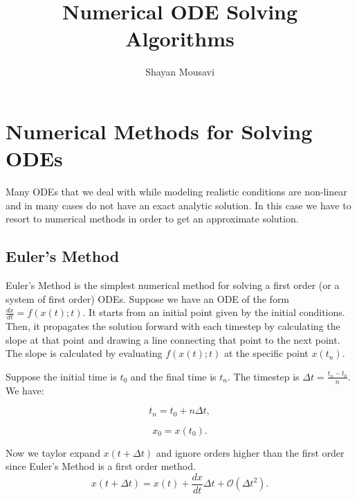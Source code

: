 \documentclass[11pt]{article}
\title{Numerical ODE Solving Algorithms}
\author{Shayan Mousavi}
\begin{document}
    
    \maketitle
    
    

    
    \hypertarget{numerical-methods-for-solving-odes}{%
\section{Numerical Methods for Solving
ODEs}\label{numerical-methods-for-solving-odes}}

Many ODEs that we deal with while modeling realistic conditions are
non-linear and in many cases do not have an exact analytic solution. In
this case we have to resort to numerical methods in order to get an
approximate solution.

\hypertarget{eulers-method}{%
\subsection{Euler's Method}\label{eulers-method}}

Euler's Method is the simplest numerical method for solving a first
order (or a system of first order) ODEs. Suppose we have an ODE of the
form \(\frac{dx}{dt}=f(x(t);t)\). It starts from an initial point given
by the initial conditions. Then, it propagates the solution forward with
each timestep by calculating the slope at that point and drawing a line
connecting that point to the next point. The slope is calculated by
evaluating \(f(x(t);t)\) at the specific point \(x(t_n)\).

Suppose the initial time is \(t_0\) and the final time is \(t_n\). The
timestep is \(\Delta t=\frac{t_n-t_0}{n}\). We have:

\begin{equation}\label{eq:t_n}
    t_n = t_0+n\Delta t, 
\end{equation}

\begin{equation}\label{eq:x_0}
    x_0 = x(t_0).
\end{equation}

Now we taylor expand \(x(t+\Delta t)\) and ignore orders higher than the
first order since Euler's Method is a first order method.
\begin{equation}\label{eq:taylor_expansion_first_order}
    x(t+\Delta t) = x(t) + \frac{dx}{dt}\Delta t + \mathscr{O}({\Delta t}^2).
\end{equation}
\end{document}

